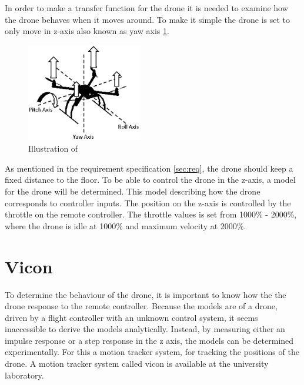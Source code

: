 In order to make a transfer function for the drone it is needed to examine how the drone behaves when it moves around. To make it simple the drone is set to only move in z-axis also known as yaw axis \ref{fig:z_axis}.
\begin{figure}[H]
    \centering
    \includegraphics[width=0.45\textwidth]{figures/ch_movement/z-axis.png}
    \caption{Illustration of \cite{drone_axis}}
    \label{fig:z_axis}
\end{figure}


 As mentioned in the requirement specification \ref{sec:req}, the drone should keep a fixed distance to the floor. To be able to control the drone in the z-axis, a model for the drone will be determined. This model describing how the drone corresponds to controller inputs. The position on the z-axis is controlled by the throttle on the remote controller. The throttle values is set from 1000\% - 2000\%, where the drone is idle at 1000\% and maximum velocity at 2000\%.  

\section{Vicon}
To determine the behaviour of the drone, it is important to know how the the drone response to the remote controller. 
Because the models are of a drone, driven by a flight controller with an unknown control system, it seems inaccessible to derive the models analytically. Instead, by measuring either an impulse response or a step
response in the z axis, the models can be determined experimentally. For this a motion tracker system, for tracking the positions of the drone. A motion tracker system called vicon is available at the university laboratory. 

